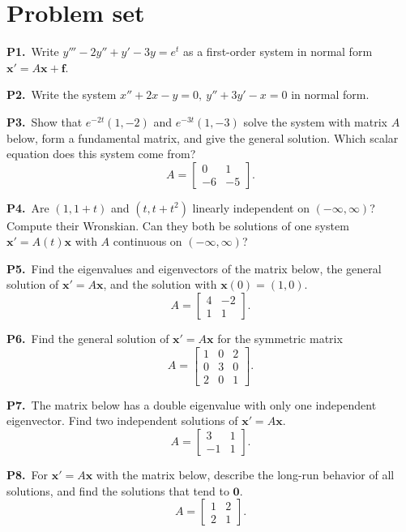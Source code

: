 \documentclass[10pt]{scrartcl}
\newcommand{\vv}[1]{\mathbf{#1}}
\begin{document}
\section{Problem set}
\begin{prob}
  \textbf{P1.}\ Write $y'''-2y''+y'-3y=e^t$ as a first-order system in normal form $\vv x'=A\vv x+\vv f$.
\end{prob}
\begin{prob}
  \textbf{P2.}\ Write the system $x''+2x-y=0,\ y''+3y'-x=0$ in normal form.
\end{prob}
\begin{prob}
  \textbf{P3.}\ Show that $e^{-2t}(1,-2)$ and $e^{-3t}(1,-3)$ solve the system with matrix $A$ below, form a fundamental matrix, and give the general solution. Which scalar equation does this system come from?
  \[
    A=\begin{bmatrix}0&1\\-6&-5\end{bmatrix}.
  \]
\end{prob}
\begin{prob}
  \textbf{P4.}\ Are $(1,1+t)$ and $(t,t+t^2)$ linearly independent on $(-\infty,\infty)$? Compute their Wronskian. Can they both be solutions of one system $\vv x'=A(t)\vv x$ with $A$ continuous on $(-\infty,\infty)$?
\end{prob}
\begin{prob}
  \textbf{P5.}\ Find the eigenvalues and eigenvectors of the matrix below, the general solution of $\vv x'=A\vv x$, and the solution with $\vv x(0)=(1,0)$.
  \[
    A=\begin{bmatrix}4&-2\\1&1\end{bmatrix}.
  \]
\end{prob}
\begin{prob}
  \textbf{P6.}\ Find the general solution of $\vv x'=A\vv x$ for the symmetric matrix
  \[
    A=\begin{bmatrix}1&0&2\\0&3&0\\2&0&1\end{bmatrix}.
  \]
\end{prob}
\begin{prob}
  \textbf{P7.}\ The matrix below has a double eigenvalue with only one independent eigenvector. Find two independent solutions of $\vv x'=A\vv x$.
  \[
    A=\begin{bmatrix}3&1\\-1&1\end{bmatrix}.
  \]
\end{prob}
\begin{prob}
  \textbf{P8.}\ For $\vv x'=A\vv x$ with the matrix below, describe the long-run behavior of all solutions, and find the solutions that tend to $\vv 0$.
  \[
    A=\begin{bmatrix}1&2\\2&1\end{bmatrix}.
  \]
\end{prob}
\end{document}
